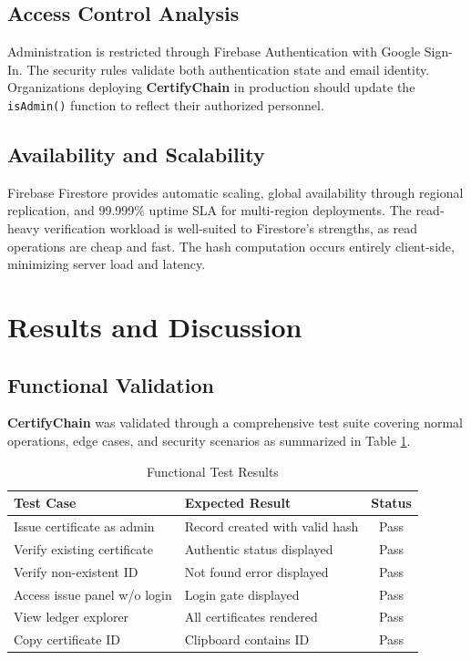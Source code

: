 \documentclass[10pt,twocolumn,a4paper]{article}
\newcommand{\certifychain}{\textbf{CertifyChain}}
\begin{document}
\subsection{Access Control Analysis}

Administration is restricted through Firebase Authentication with Google Sign-In. The security rules validate both authentication state and email identity. Organizations deploying \certifychain{} in production should update the \texttt{isAdmin()} function to reflect their authorized personnel.

\subsection{Availability and Scalability}

Firebase Firestore provides automatic scaling, global availability through regional replication, and 99.999\% uptime SLA for multi-region deployments. The read-heavy verification workload is well-suited to Firestore's strengths, as read operations are cheap and fast. The hash computation occurs entirely client-side, minimizing server load and latency.

\section{Results and Discussion}

\subsection{Functional Validation}

\certifychain{} was validated through a comprehensive test suite covering normal operations, edge cases, and security scenarios as summarized in Table \ref{tab:tests}.

\begin{table}[H]
    \centering
    \caption{Functional Test Results}
    \label{tab:tests}
    \begin{tabular}{@{}lp{4cm}c@{}}
        \toprule
        \textbf{Test Case} & \textbf{Expected Result} & \textbf{Status} \\
        \midrule
        Issue certificate as admin & Record created with valid hash & Pass \\
        Verify existing certificate & Authentic status displayed & Pass \\
        Verify non-existent ID & Not found error displayed & Pass \\
        Access issue panel w/o login & Login gate displayed & Pass \\
        View ledger explorer & All certificates rendered & Pass \\
        Copy certificate ID & Clipboard contains ID & Pass \\
        \bottomrule
    \end{tabular}
\end{table}
\end{document}
